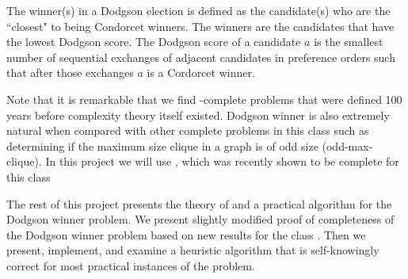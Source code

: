 The winner(s) in a Dodgson election is defined as the candidate(s) who are
the ``closest" to being Condorcet winners.
The winners are the candidates that have the lowest Dodgson score.
The Dodgson score of a candidate $a$ is the smallest number of
sequential exchanges of adjacent candidates in preference orders such that
after those exchanges $a$ is a Cordorcet winner.

Note that it is remarkable that we find \tp-complete problems that were defined
100 years before complexity theory itself existed.
Dodgson winner is also extremely natural when compared with other complete
problems in this class such as determining if the maximum size clique in a
graph is of odd size (odd-max-clique).
In this project we will use , %
which was recently shown to be complete for this class \citep{compsat}


The rest of this project presents the theory of and a practical algorithm for
the Dodgson winner problem.
We present slightly modified proof of completeness of
the Dodgson winner problem based on new results for the class \tp.
Then we present, implement, and examine a heuristic algorithm
that is self-knowingly correct for most practical instances of the problem.



